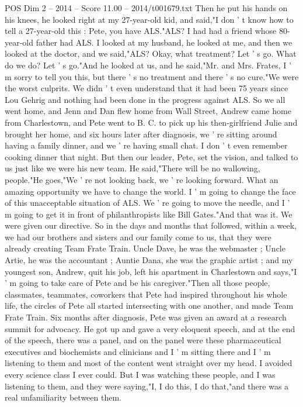 \begin{textsample}{POS Dim 2 – 2014 – Score 11.00 – 2014/t001679.txt}
Then he put his hands on his knees, he looked right at my 27-year-old kid, and said,"I don ' t know how to tell a 27-year-old this : Pete, you have ALS."ALS?
I had had a friend whose 80-year-old father had ALS.
I looked at my husband, he looked at me, and then we looked at the doctor, and we said,"ALS?
Okay, what treatment?
Let ' s go.
What do we do?
Let ' s go."And he looked at us, and he said,"Mr. and Mrs.
Frates, I ' m sorry to tell you this, but there ' s no treatment and there ' s no cure."We were the worst culprits.
We didn ' t even understand that it had been 75 years since Lou Gehrig and nothing had been done in the progress against ALS.
So we all went home, and Jenn and Dan flew home from Wall Street, Andrew came home from Charlestown, and Pete went to B.
C. to pick up his then-girlfriend Julie and brought her home, and six hours later after diagnosis, we ' re sitting around having a family dinner, and we ' re having small chat.
I don ' t even remember cooking dinner that night.
But then our leader, Pete, set the vision, and talked to us just like we were his new team.
He said,"There will be no wallowing, people."He goes,"We ' re not looking back, we ' re looking forward.
What an amazing opportunity we have to change the world.
I ' m going to change the face of this unacceptable situation of ALS.
We ' re going to move the needle, and I ' m going to get it in front of philanthropists like Bill Gates."And that was it.
We were given our directive.
So in the days and months that followed, within a week, we had our brothers and sisters and our family come to us, that they were already creating Team Frate Train.
Uncle Dave, he was the webmaster ; Uncle Artie, he was the accountant ; Auntie Dana, she was the graphic artist ; and my youngest son, Andrew, quit his job, left his apartment in Charlestown and says,"I ' m going to take care of Pete and be his caregiver."Then all those people, classmates, teammates, coworkers that Pete had inspired throughout his whole life, the circles of Pete all started intersecting with one another, and made Team Frate Train.
Six months after diagnosis, Pete was given an award at a research summit for advocacy.
He got up and gave a very eloquent speech, and at the end of the speech, there was a panel, and on the panel were these pharmaceutical executives and biochemists and clinicians and I ' m sitting there and I ' m listening to them and most of the content went straight over my head.
I avoided every science class I ever could.
But I was watching these people, and I was listening to them, and they were saying,"I, I do this, I do that,"and there was a real unfamiliarity between them.

\end{textsample}
